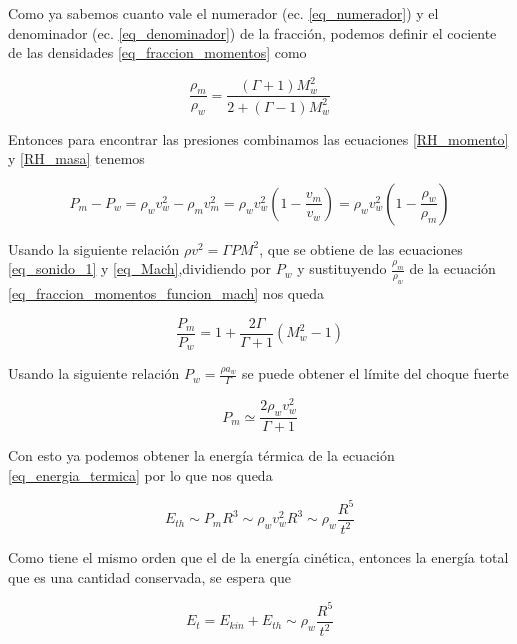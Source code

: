 \documentclass[12pt,a4paper]{book}
\begin{document}
Como ya sabemos cuanto vale el numerador (ec. \ref{eq_numerador}) y el denominador (ec. \ref{eq_denominador})
de la fracción, podemos definir el cociente de las densidades \ref{eq_fraccion_momentos} como 

\begin{equation}\label{eq_fraccion_momentos_funcion_mach}
  \frac{\rho_m}{\rho_w} = \frac{\left( \Gamma +1 \right) M_w^2}{2+ \left( \Gamma -1 \right) M_w^2}
\end{equation}

Entonces para encontrar las presiones combinamos las ecuaciones \ref{RH_momento} y \ref{RH_masa} tenemos

\begin{equation}
  P_m - P_w = \rho_w v_w^2 - \rho_m v_m^2 = \rho_w v_w^2 \left( 1 - \frac{v_m}{v_w}\right) = \rho_w v_w^2 \left( 1 - \frac{\rho_w}{\rho_m}\right)
\end{equation}

Usando la siguiente relación $\rho v^2 = \Gamma P M^2$, que se obtiene de las ecuaciones \ref{eq_sonido_1} y
\ref{eq_Mach},dividiendo por $P_w$ y sustituyendo  $\frac{\rho_m}{\rho_w}$ de la ecuación \ref{eq_fraccion_momentos_funcion_mach}
nos queda

\begin{equation} \label{eq_fraccion_Presiones}
  \frac{P_m}{P_w} = 1 + \frac{2 \Gamma}{\Gamma + 1} \left( M_w^2 -1\right)
\end{equation}

Usando la siguiente relación $ P_w = \frac{\rho a_w }{\Gamma}$ se puede obtener el límite del choque fuerte

\begin{equation}
  P_m  \simeq \frac{2 \rho_w v_w^2}{\Gamma + 1}
\end{equation}

Con esto ya podemos obtener la energía térmica de la ecuación \ref{eq_energia_termica} por lo que nos queda 

\begin{equation}
  E_{th} \sim P_m R^3 \sim \rho_w v_w^2 R^3 \sim \rho_w \frac{R^5}{t^2}
\end{equation}

Como tiene el mismo orden que el de la energía cinética, entonces la energía total que es una cantidad conservada, se espera que

\begin{equation}
  E_t = E_{kin} + E_{th} \sim \rho_w \frac{R^5}{t^2}
\end{equation}
\end{document}
